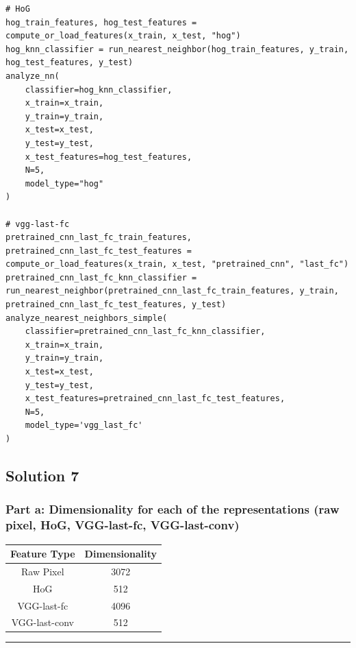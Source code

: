 \documentclass{article}
\begin{document}
\begin{lstlisting}
# HoG
hog_train_features, hog_test_features = compute_or_load_features(x_train, x_test, "hog")
hog_knn_classifier = run_nearest_neighbor(hog_train_features, y_train, hog_test_features, y_test)
analyze_nn(
    classifier=hog_knn_classifier,
    x_train=x_train,  
    y_train=y_train,
    x_test=x_test,    
    y_test=y_test,
    x_test_features=hog_test_features, 
    N=5,
    model_type="hog"
)

# vgg-last-fc
pretrained_cnn_last_fc_train_features, pretrained_cnn_last_fc_test_features = compute_or_load_features(x_train, x_test, "pretrained_cnn", "last_fc")
pretrained_cnn_last_fc_knn_classifier = run_nearest_neighbor(pretrained_cnn_last_fc_train_features, y_train, pretrained_cnn_last_fc_test_features, y_test)
analyze_nearest_neighbors_simple(
    classifier=pretrained_cnn_last_fc_knn_classifier,
    x_train=x_train,  
    y_train=y_train,
    x_test=x_test,    
    y_test=y_test,
    x_test_features=pretrained_cnn_last_fc_test_features, 
    N=5,
    model_type='vgg_last_fc'
)
\end{lstlisting}

\newpage
\subsection*{Solution 7}
\subsubsection*{Part a: Dimensionality for each of the representations (raw pixel, HoG, VGG-last-fc, VGG-last-conv)}
\begin{center} 
  \begin{tabular}{|c|c|} 
    \hline Feature Type & Dimensionality \\ 
    \hline 
    Raw Pixel & 3072 \\ 
    HoG & 512  \\
    VGG-last-fc & 4096 \\
    VGG-last-conv & 512 \\ 
    \hline
  \end{tabular}
\end{center}

\noindent\rule{\textwidth}{0.4pt}\\
\end{document}
